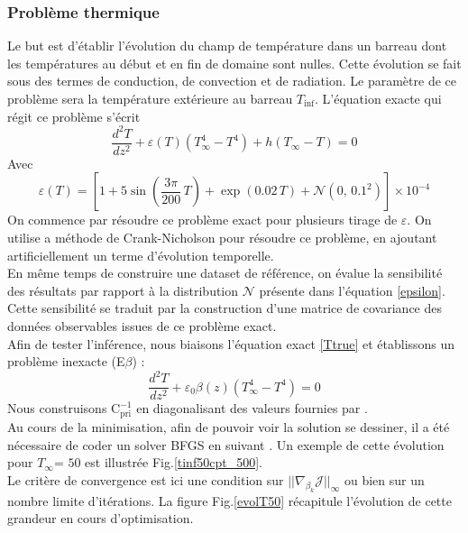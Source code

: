 \documentclass[a4paper,12pt]{article}
\newcommand{\bepar}[1]{
	\left( #1 \right)  
}
\newcommand{\becro}[1]{
	\left[ #1 \right]  
}
\newcommand{\covpri}{\text{C}^{-1}_{\text{pri}}}
\newcommand{\J}{\mathcal{J}}
\newcommand{\tinf}{$T_\infty$}
\newcommand\bk{\color{black}}
\newcommand\dsb{\color{dsb}}
\numberwithin{equation}{section} %
\begin{document}
\dsb \subsubsection{Problème thermique} \bk
Le but est d'établir l'évolution du champ de température dans un barreau dont les températures au début et en fin de domaine sont nulles. Cette évolution se fait sous des termes de conduction, de convection et de radiation. Le paramètre de ce problème sera la température extérieure au barreau $T_\text{inf}$. 
L'équation exacte qui régit ce problème s'écrit 
\begin{equation}
 \frac{d^2T}{dz^2} + \varepsilon(T)\bepar{T^4_\infty - T^4} + h\bepar{T_\infty - T} = 0 \label{Ttrue} \tag{EE}
 \end{equation} 
 Avec 
 \begin{equation}
 \varepsilon(T) = \becro{1 + 5 \sin\bepar{\frac{3\pi}{200}\, T} + \exp\bepar{0.02\,T}+ \mathcal{N}\bepar{0,\, 0.1^2}} \times 10^{-4} \label{epsilon}
 \end{equation}
 On commence par résoudre ce problème exact pour plusieurs tirage de $\varepsilon$. On utilise a méthode de Crank-Nicholson pour résoudre ce problème, en ajoutant artificiellement un terme d'évolution temporelle.\\
 En même temps de construire une dataset de référence, on évalue la sensibilité des résultats par rapport à la distribution $\mathcal{N}$ présente dans l'équation \eqref{epsilon}. Cette sensibilité se traduit par la construction d'une matrice de covariance des données observables issues de ce problème exact.\\
 Afin de tester l'inférence, nous biaisons l'équation exact \eqref{Ttrue} et établissons un problème inexacte (E$\beta$) :
\begin{equation}
\frac{d^2T}{dz^2} + \varepsilon_0\beta(z)\bepar{T^4_\infty - T^4}= 0 \tag{E$\beta$} \label{Tinex}
\end{equation}
Nous construisons $\covpri$ en diagonalisant des valeurs fournies par \citep{parish2016paradigm}.\\

Au cours de la minimisation,  afin de pouvoir voir la solution se dessiner, il a été nécessaire de coder un solver BFGS en suivant \citep{nocedal2006numerical}. Un exemple de cette évolution pour \tinf = $50$ est illustrée Fig.\eqref{tinf50cpt_500}.\\
Le critère de convergence est ici une condition sur $||\nabla_{\beta_k}\J||_\infty$ ou bien sur un nombre limite d'itérations. La figure Fig.\eqref{evolT50} récapitule l'évolution de cette grandeur en cours d'optimisation.\\
\end{document}
